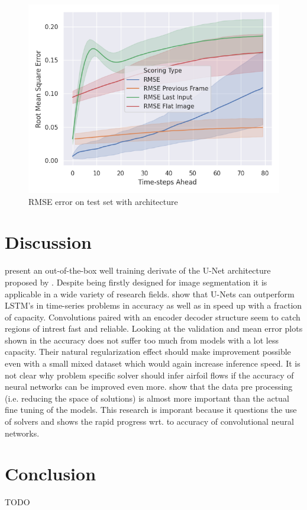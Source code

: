 \documentclass[acmtog]{techreportacmart}
\begin{document}
\begin{figure}[H]
  \includegraphics[width=.4\textwidth]{figures/transfer/Transfer_Test_RMSE_Quality_start_15}
  \caption{RMSE error on test set with \cite{Fotiadis2020} architecture}
  \label{fig:T2}
\end{figure}


\section{Discussion}
\cite{Thuerey20} present an out-of-the-box well training derivate of the U-Net architecture proposed by \cite{ronneberger2015}. Despite being firstly designed for image segmentation it is applicable in a wide variety of research fields. \cite{Fotiadis2020} show that U-Nets can outperform LSTM's in time-series problems in accuracy as well as in speed up with a fraction of capacity. Convolutions paired with an encoder decoder structure seem to catch regions of intrest fast and reliable. Looking at the validation and mean error plots shown in \cite{Thuerey20} the accuracy does not suffer too much from models with a lot less capacity. Their natural regularization effect should make improvement possible even with a small mixed dataset which would again increase inference speed. It is not clear why problem specific solver should infer airfoil flows if the accuracy of neural networks can be improved even more. \cite{Thuerey20} show that the data pre processing (i.e. reducing the space of solutions) is almost more important than the actual fine tuning of the models. This research is imporant because it questions the use of solvers and shows the rapid progress wrt. to accuracy of convolutional neural networks.

\section{Conclusion} 
TODO




\newpage
\clearpage
\end{document}
